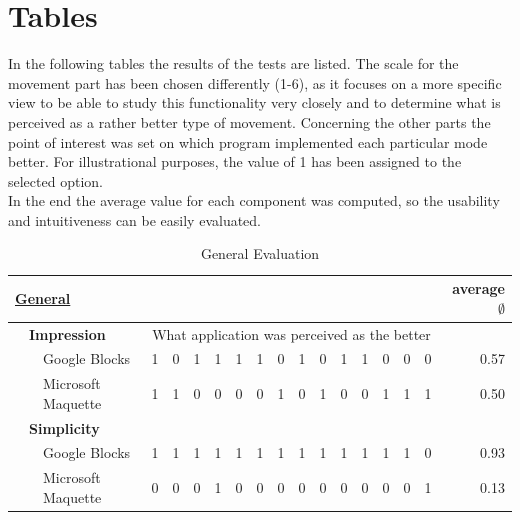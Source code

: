 \documentclass{report}
\begin{document}
	\section{Tables}
	\startsection	
		In the following tables the results of the tests are listed. The scale for the movement part has been chosen differently (1-6), as it focuses on a more specific view to be able to study this functionality very closely and to determine what is perceived as a rather better type of movement. Concerning the other parts the point of interest was set on which program implemented each particular mode better. For illustrational purposes, the value of 1 has been assigned to the selected option. \\
		In the end the average value for each component was computed, so the usability and intuitiveness can be easily evaluated. \\		
		\begin{table}[H]
			\begin{center}
			\begin{tabular}{@{}|lll|llllllllllllll|r|@{}}
				\hline
				\multicolumn{3}{|l|}{\textbf{\underline{General}}} & & & & & & & & & & & & & & & \textbf{average $\emptyset$} \\ \hline
				& \multicolumn{2}{l|}{\textbf{Impression}} & \multicolumn{14}{c|}{\small{What application was perceived as the better}} &\\ \hline
				& & Google Blocks & 1 & 0 & 1 & 1 & 1 & 1 & 0 & 1 & 0 & 1 & 1 & 0 & 0 & 0 & 0.57 \\
				& & Microsoft Maquette & 1 & 1 & 0 & 0 & 0 & 0 & 1 & 0 & 1 & 0 & 0 & 1 & 1 & 1 & 0.50 \\ \hline
				
				& \multicolumn{2}{l|}{\textbf{Simplicity}} & & & & & & & & & & & & & & &\\ \hline
				& & Google Blocks & 1 & 1 & 1 & 1 & 1 & 1 & 1 & 1 & 1 & 1 & 1 & 1 & 1 & 0 & 0.93 \\
				& & Microsoft Maquette & 0 & 0 & 0 & 1 & 0 & 0 & 0 & 0 & 0 & 0 & 0 & 0 & 0 & 1 & 0.13 \\ \hline
			\end{tabular}
			\caption{General Evaluation}
			\label{tab:GeneralEvaluation}
			\end{center}
		\end{table}
		
\end{document}

